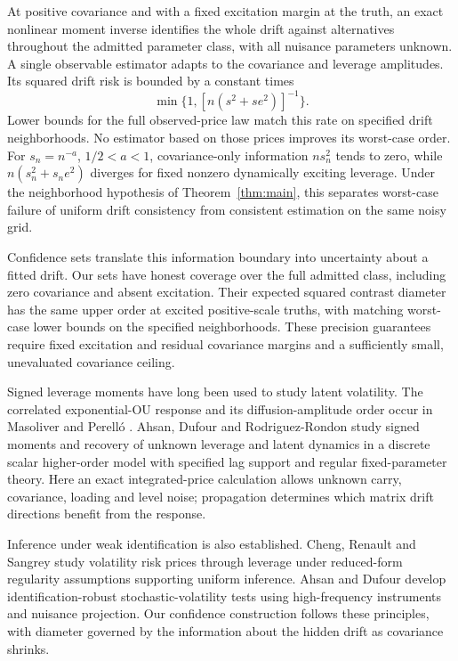 \documentclass[11pt,a4paper]{amsart}
\theoremstyle{plain}
\theoremstyle{definition}
\theoremstyle{remark}
\begin{document}
At positive covariance and with a fixed excitation margin at the truth,
an exact nonlinear moment inverse identifies the whole drift against
alternatives throughout the admitted parameter class, with all nuisance
parameters unknown. A single observable estimator adapts to the covariance
and leverage amplitudes. Its squared drift risk is bounded by a constant
times
\[
 \min\{1,[n(s^2+se^2)]^{-1}\}.
\]
Lower bounds for the full observed-price law match this rate on specified
drift neighborhoods. No estimator based on those prices improves its
worst-case order. For
$s_n=n^{-a}$, $1/2<a<1$, covariance-only information $ns_n^2$ tends to
zero, while $n(s_n^2+s_ne^2)$ diverges for fixed nonzero dynamically
exciting leverage. Under the neighborhood hypothesis of
Theorem~\ref{thm:main}, this separates worst-case failure of uniform drift
consistency from consistent estimation on the same noisy grid.

Confidence sets translate this information boundary into uncertainty about
a fitted drift. Our sets have honest coverage over the full admitted class,
including zero covariance and absent excitation. Their expected squared
contrast diameter has the same upper order at excited positive-scale
truths, with matching worst-case lower bounds on the specified
neighborhoods. These precision guarantees require fixed excitation and
residual covariance margins and a sufficiently small, unevaluated
covariance ceiling.

Signed leverage moments have long been used to study latent volatility.
The correlated exponential-OU response and its diffusion-amplitude order
occur in Masoliver and Perell\'o \cite{MasoliverPerello2005}.
Ahsan, Dufour and Rodriguez-Rondon \cite{ADR2025journal} study signed
moments and recovery of unknown leverage and latent dynamics in a discrete
scalar higher-order model with specified lag support and regular
fixed-parameter theory. Here an exact integrated-price calculation allows
unknown carry, covariance, loading and level noise; propagation determines
which matrix drift directions benefit from the response.

Inference under weak identification is also established. Cheng, Renault
and Sangrey \cite{ChengRenaultSangrey2024} study volatility risk prices
through leverage under reduced-form regularity assumptions supporting
uniform inference. Ahsan and Dufour \cite{AhsanDufour2024} develop
identification-robust stochastic-volatility tests using high-frequency
instruments and nuisance projection. Our confidence construction follows
these principles, with diameter governed by the information about the
hidden drift as covariance shrinks.
\end{document}
